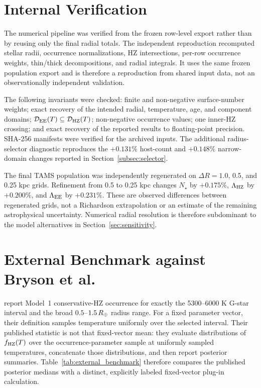 \section{Internal Verification}\label{sec:verification}

The numerical pipeline was verified from the frozen row-level export rather than by reusing only the final radial totals. The independent reproduction recomputed stellar radii, occurrence normalizations, HZ intersections, per-row occurrence weights, thin/thick decompositions, and radial integrals. It uses the same frozen population export and is therefore a reproduction from shared input data, not an observationally independent validation.

The following invariants were checked: finite and non-negative surface-number weights; exact recovery of the intended radial, temperature, age, and component domains; $\mathcal{D}_{\rm EE}(T)\subseteq\mathcal{D}_{\rm HZ}(T)$; non-negative occurrence values; one inner-HZ crossing; and exact recovery of the reported results to floating-point precision. SHA-256 manifests were verified for the archived inputs. The additional radius-selector diagnostic reproduces the $+0.131\%$ host-count and $+0.148\%$ narrow-domain changes reported in Section~\ref{subsec:selector}.

The final TAMS population was independently regenerated on $\Delta R=1.0$, 0.5, and 0.25 kpc grids. Refinement from 0.5 to 0.25 kpc changes $N_\star$ by $+0.175\%$, $\Lambda_{\rm HZ}$ by $+0.200\%$, and $\Lambda_{\rm EE}$ by $+0.231\%$. These are observed differences between regenerated grids, not a Richardson extrapolation or an estimate of the remaining astrophysical uncertainty. Numerical radial resolution is therefore subdominant to the model alternatives in Section~\ref{sec:sensitivity}.

\section{External Benchmark against Bryson et al.}\label{sec:benchmark}

\citet{Bryson2021} report Model~1 conservative-HZ occurrence for exactly the 5300--6000 K G-star interval and the broad $0.5$--$1.5\,R_{\oplus}$ radius range. For a fixed parameter vector, their definition samples temperature uniformly over the selected interval. Their published statistic is not that fixed-vector mean: they evaluate distributions of $f_{\rm HZ}(T)$ over the occurrence-parameter sample at uniformly sampled temperatures, concatenate those distributions, and then report posterior summaries. Table~\ref{tab:external_benchmark} therefore compares the published posterior medians with a distinct, explicitly labeled fixed-vector plug-in calculation.

